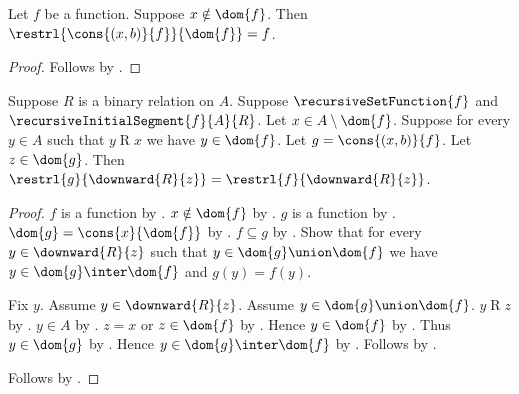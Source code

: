 \begin{corollary}\label{extend_set_function_at_new_point_restriction}
    Let $f$ be a function.
    Suppose $x\notin\dom{f}$.
    Then $\restrl{\cons{(x,b)}{f}}{\dom{f}}=f$.
\end{corollary}
\begin{proof}
    Follows by
        .
\end{proof}

\begin{lemma}\label{unbounded_recursive_extension_restriction}
    Suppose $R$ is a binary relation on $A$.
    Suppose $\recursiveSetFunction{f}$ and
        $\recursiveInitialSegment{f}{A}{R}$.
    Let $x\in A\setminus\dom{f}$.
    Suppose for every $y\in A$ such that $y\mathrel{R}x$ we have
        $y\in\dom{f}$.
    Let $g=\cons{(x,b)}{f}$.
    Let $z\in\dom{g}$.
    Then
        $\restrl{g}{\downward{R}{z}}
            =\restrl{f}{\downward{R}{z}}$.
\end{lemma}
\begin{proof}
    $f$ is a function by .
    $x\notin\dom{f}$ by .
    $g$ is a function by .
    $\dom{g}=\cons{x}{\dom{f}}$ by
        .
    $f\subseteq g$ by .
    Show that for every $y\in\downward{R}{z}$ such that
        $y\in\dom{g}\union\dom{f}$ we have
        $y\in\dom{g}\inter\dom{f}$ and $g(y)=f(y)$.
    \begin{subproof}
        Fix $y$.
        Assume $y\in\downward{R}{z}$.
        Assume $y\in\dom{g}\union\dom{f}$.
        $y\mathrel{R}z$ by .
        $y\in A$ by .
        $z=x$ or $z\in\dom{f}$ by .
        Hence $y\in\dom{f}$ by
            .
        Thus $y\in\dom{g}$ by .
        Hence $y\in\dom{g}\inter\dom{f}$ by .
        Follows by .
    \end{subproof}
    Follows by .
\end{proof}

